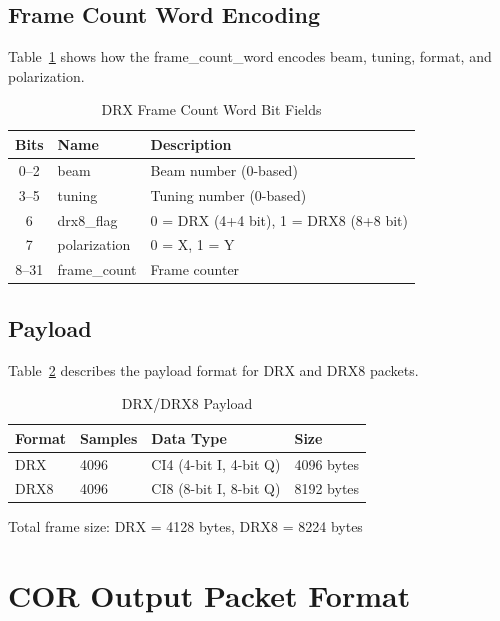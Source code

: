 \subsection{Frame Count Word Encoding}

Table~\ref{tab:drx-fcw} shows how the frame\_count\_word encodes beam, tuning, format, and polarization.

\begin{table}[htbp]
    \centering
    \caption{DRX Frame Count Word Bit Fields}
    \label{tab:drx-fcw}
    \begin{tabular}{cll}
        \toprule
        \textbf{Bits} & \textbf{Name} & \textbf{Description} \\
        \midrule
        0--2 & beam & Beam number (0-based) \\
        3--5 & tuning & Tuning number (0-based) \\
        6 & drx8\_flag & 0 = DRX (4+4 bit), 1 = DRX8 (8+8 bit) \\
        7 & polarization & 0 = X, 1 = Y \\
        8--31 & frame\_count & Frame counter \\
        \bottomrule
    \end{tabular}
\end{table}

\subsection{Payload}

Table~\ref{tab:drx-payload} describes the payload format for DRX and DRX8 packets.

\begin{table}[htbp]
    \centering
    \caption{DRX/DRX8 Payload}
    \label{tab:drx-payload}
    \begin{tabular}{llll}
        \toprule
        \textbf{Format} & \textbf{Samples} & \textbf{Data Type} & \textbf{Size} \\
        \midrule
        DRX & 4096 & CI4 (4-bit I, 4-bit Q) & 4096 bytes \\
        DRX8 & 4096 & CI8 (8-bit I, 8-bit Q) & 8192 bytes \\
        \bottomrule
    \end{tabular}
\end{table}

Total frame size: DRX = 4128 bytes, DRX8 = 8224 bytes

\section{COR Output Packet Format}

